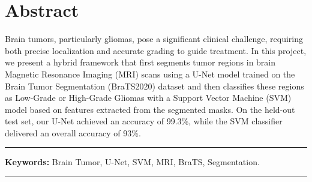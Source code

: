 \chapter*{\hfill Abstract \hfill}

Brain tumors, particularly gliomas, pose a significant clinical challenge, requiring both precise localization and accurate grading to guide treatment. In this project, we present a hybrid framework that first segments tumor regions in brain Magnetic Resonance Imaging (MRI) scans using a U-Net model trained on the Brain Tumor Segmentation (BraTS2020)  dataset and then classifies these regions as Low-Grade or High-Grade Gliomas with a Support Vector Machine (SVM) model based on features extracted from the segmented masks. On the held-out test set, our U-Net achieved an accuracy of 99.3\%, while the SVM classifier delivered an overall accuracy of 93\%.


\noindent\rule{\textwidth}{0.2pt}
\textbf{Keywords:} Brain Tumor, U-Net, SVM, MRI, BraTS, Segmentation.\\
\noindent\rule{\textwidth}{0.2pt}
